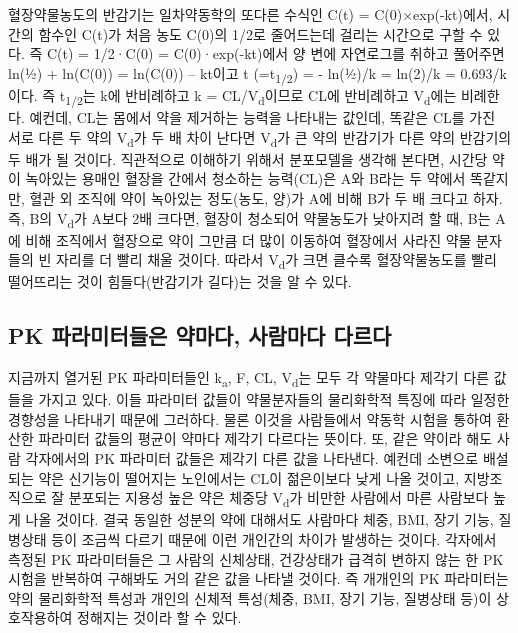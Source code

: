 \documentclass[
  11pt,
  krantz2, a4paper, twoside]{krantz}
\theoremstyle{definition}
\theoremstyle{definition}
\theoremstyle{definition}
\theoremstyle{definition}
\theoremstyle{remark}
\begin{document}
혈장약물농도의 반감기는 일차약동학의 또다른 수식인 C(t) = C(0)×exp(-kt)에서, 시간의 함수인 C(t)가 처음 농도 C(0)의 1/2로 줄어드는데 걸리는 시간으로 구할 수 있다. 
즉 C(t) = 1/2·C(0) = C(0)·exp(-kt)에서 양 변에 자연로그를 취하고 풀어주면 ln(½) + ln(C(0)) = ln(C(0)) -- kt이고 t (=t\textsubscript{1/2}) = - ln(½)/k = ln(2)/k = 0.693/k이다.
즉 t\textsubscript{1/2}는 k에 반비례하고 k = CL/V\textsubscript{d}이므로 CL에 반비례하고 V\textsubscript{d}에는 비례한다.
예컨데, CL는 몸에서 약을 제거하는 능력을 나타내는 값인데, 똑같은 CL를 가진 서로 다른 두 약의 V\textsubscript{d}가 두 배 차이 난다면 V\textsubscript{d}가 큰 약의 반감기가 다른 약의 반감기의 두 배가 될 것이다. 
직관적으로 이해하기 위해서 분포모델을 생각해 본다면, 시간당 약이 녹아있는 용매인 혈장을 간에서 청소하는 능력(CL)은 A와 B라는 두 약에서 똑같지만, 혈관 외 조직에 약이 녹아있는 정도(농도, 양)가 A에 비해 B가 두 배 크다고 하자.
즉, B의 V\textsubscript{d}가 A보다 2배 크다면, 혈장이 청소되어 약물농도가 낮아지려 할 때, B는 A에 비해 조직에서 혈장으로 약이 그만큼 더 많이 이동하여 혈장에서 사라진 약물 분자들의 빈 자리를 더 빨리 채울 것이다.
따라서 V\textsubscript{d}가 크면 클수록 혈장약물농도를 빨리 떨어뜨리는 것이 힘들다(반감기가 길다)는 것을 알 수 있다.

\subsection{PK 파라미터들은 약마다, 사람마다 다르다}\label{pk-uxd30cuxb77cuxbbf8uxd130uxb4e4uxc740-uxc57duxb9c8uxb2e4-uxc0acuxb78cuxb9c8uxb2e4-uxb2e4uxb974uxb2e4}

지금까지 열거된 PK 파라미터들인 k\textsubscript{a}, F, CL, V\textsubscript{d}는 모두 각 약물마다 제각기 다른 값들을 가지고 있다.
이들 파라미터 값들이 약물분자들의 물리화학적 특징에 따라 일정한 경향성을 나타내기 때문에 그러하다.
물론 이것을 사람들에서 약동학 시험을 통하여 환산한 파라미터 값들의 평균이
약마다 제각기 다르다는 뜻이다.
또, 같은 약이라 해도 사람 각자에서의 PK 파라미터 값들은 제각기 다른 값을 나타낸다.
예컨데 소변으로 배설되는 약은 신기능이 떨어지는 노인에서는 CL이 젊은이보다 낮게 나올 것이고, 지방조직으로 잘 분포되는 지용성 높은 약은 체중당 V\textsubscript{d}가 비만한 사람에서 마른 사람보다 높게 나올 것이다.
결국 동일한 성분의 약에 대해서도
사람마다 체중, BMI, 장기 기능, 질병상태 등이 조금씩 다르기 때문에 이런 개인간의 차이가 발생하는 것이다.
각자에서 측정된 PK 파라미터들은 그 사람의 신체상태, 건강상태가 급격히 변하지 않는 한 PK 시험을 반복하여 구해봐도 거의 같은 값을 나타낼 것이다.
즉 개개인의 PK 파라미터는 약의 물리화학적 특성과 개인의 신체적 특성(체중, BMI, 장기 기능, 질병상태 등)이 상호작용하여 정해지는 것이라 할 수 있다.
\end{document}
